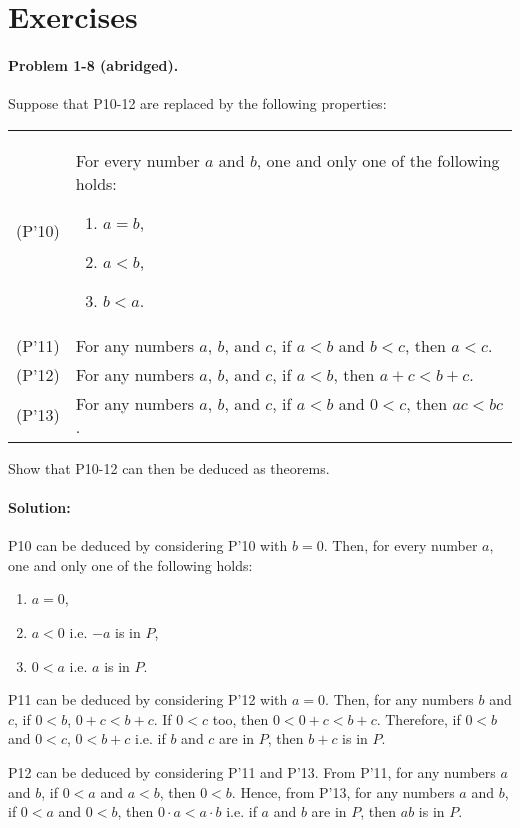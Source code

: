 \documentclass{article}
\begin{document}
\section*{Exercises}

\paragraph{Problem 1-8 (abridged).} Suppose that P10-12 are replaced by the
following properties:

\begin{tabular}{l p{4in}}
  (P'10) & For every number $a$ and $b$, one and only one of the following
    holds: \begin{enumerate}
      \itemsep0em
      \item $a = b$,
      \item $a < b$,
      \item $b < a$.
    \end{enumerate} \\
  (P'11) & For any numbers $a$, $b$, and $c$, if $a < b$ and $b < c$, then $a <
    c$. \\
  (P'12) & For any numbers $a$, $b$, and $c$, if $a < b$, then $a + c < b + c$.
    \\
  (P'13) & For any numbers $a$, $b$, and $c$, if $a < b$ and $0 < c$, then $ac
    < bc$. \\
\end{tabular}

Show that P10-12 can then be deduced as theorems.

\paragraph{Solution:} P10 can be deduced by considering P'10 with $b = 0$.
Then, for every number $a$, one and only one of the following holds:
\begin{enumerate}
  \itemsep0em
  \item $a = 0$,
  \item $a < 0$ i.e. $-a$ is in $P$,
  \item $0 < a$ i.e. $a$ is in $P$.
\end{enumerate}

P11 can be deduced by considering P'12 with $a = 0$. Then, for any numbers $b$
and $c$, if $0 < b$, $0 + c < b + c$. If $0 < c$ too, then $0 < 0 + c < b + c$.
Therefore, if $0 < b$ and $0 < c$, $0 < b + c$ i.e. if $b$ and $c$ are in $P$,
then $b + c$ is in $P$.

P12 can be deduced by considering P'11 and P'13. From P'11, for any numbers $a$
and $b$, if $0 < a$ and $a < b$, then $0 < b$. Hence, from P'13, for any
numbers $a$ and $b$, if $0 < a$ and $0 < b$, then $0 \cdot a < a \cdot b$ i.e.
if $a$ and $b$ are in $P$, then $ab$ is in $P$.
\end{document}
